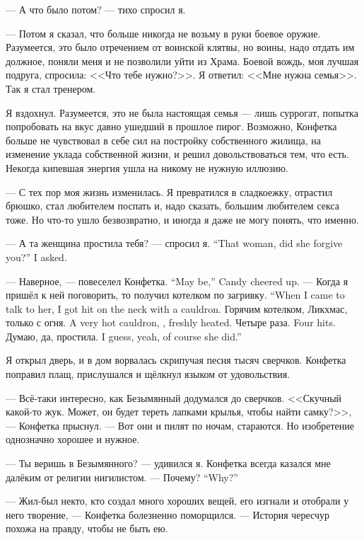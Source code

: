 --- А что было потом? --- тихо спросил я.

--- Потом я сказал, что больше никогда не возьму в руки боевое оружие.
Разумеется, это было отречением от воинской клятвы, но воины, надо отдать им должное, поняли меня и не позволили уйти из Храма.
Боевой вождь, моя лучшая подруга, спросила: <<Что тебе нужно?>>.
Я ответил: <<Мне нужна семья>>.
Так я стал тренером.

Я вздохнул.
Разумеется, это не была настоящая семья --- лишь суррогат, попытка попробовать на вкус давно ушедший в прошлое пирог.
Возможно, Конфетка больше не чувствовал в себе сил на постройку собственного жилища, на изменение уклада собственной жизни, и решил довольствоваться тем, что есть. Некогда кипевшая энергия ушла на никому не нужную иллюзию.

--- С тех пор моя жизнь изменилась.
Я превратился в сладкоежку, отрастил брюшко, стал любителем поспать и, надо сказать, большим любителем секса тоже.
Но что-то ушло безвозвратно, и иногда я даже не могу понять, что именно.

{--- А та женщина простила тебя? --- спросил я.}
{``That woman, did she forgive you?'' I asked.}

{--- Наверное, --- повеселел Конфетка.}
{``May be,'' Candy cheered up.}
{--- Когда я пришёл к ней поговорить, то получил котелком по загривку.}
{``When I came to talk to her, I got hit on the neck with a cauldron.}
{Горячим котелком, Ликхмас, только с огня.}
{A very hot cauldron, \Likchmas, freshly heated.}
{Четыре раза.}
{Four hits.}
{Думаю, да, простила.}
{I guess, yeah, of course she did.''}

\asterism

Я открыл дверь, и в дом ворвалась скрипучая песня тысяч сверчков.
Конфетка поправил плащ, прислушался и щёлкнул языком от удовольствия.

--- Всё-таки интересно, как Безымянный додумался до сверчков.
<<Скучный какой-то жук.
Может, он будет тереть лапками крылья, чтобы найти самку?>>, --- Конфетка прыснул.
--- Вот они и пилят по ночам, стараются.
Но изобретение однозначно хорошее и нужное.

--- Ты веришь в Безымянного? --- удивился я.
Конфетка всегда казался мне далёким от религии нигилистом.
{--- Почему?}
{``Why?''}

--- Жил-был некто, кто создал много хороших вещей, его изгнали и отобрали у него творение, --- Конфетка болезненно поморщился.
--- История чересчур похожа на правду, чтобы не быть ею.

